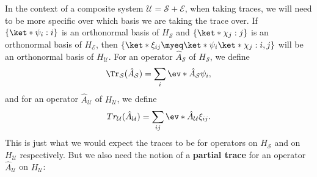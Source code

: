 \documentclass[12pt]{report}
\begin{document}
    In the context of a composite system $\mathcal{U}=\mathcal{S}+\mathcal{E}$, 
    when taking traces, we will need to be more specific over which basis we are taking the trace over. 
     If $\{\ket*{\psi_i}:i\}$ is an orthonormal basis of $H_\mathcal{S}$ and $\{\ket*{\chi_j}:j\}$ 
     is an orthonormal basis of $H_\mathcal{E}$, 
     then $\{\ket*{\xi_{ij}}\myeq\ket*{\psi_i}\ket*{\chi_j}:i,j\}$ 
     will be an orthonormal basis of $H_\mathcal{U}$. 
     For an operator $\hat{A}_\mathcal{S}$ of $H_\mathcal{S}$, we define 
    $$\Tr_\mathcal{S}(\hat{A}_\mathcal{S})=\sum_i \ev*{\hat{A}_\mathcal{S}}{\psi_i},$$
     and for an operator $\hat{A}_\mathcal{U}$ of $H_\mathcal{U}$, we define 
     \begin{equation}\label{fulltrace}Tr_\mathcal{U}(\hat{A}_\mathcal{U})=\sum_{ij} \ev*{\hat{A}_\mathcal{U}}{\xi_{ij}}.
    \end{equation} 
    This  %
% 
    is just what we would expect the traces to be for operators on $H_\mathcal{S}$ and on $H_\mathcal{U}$ respectively. But we also need the notion of a \textbf{partial trace} for an operator $\hat{A}_\mathcal{U}$ on $H_\mathcal{U}$: 
\end{document}
